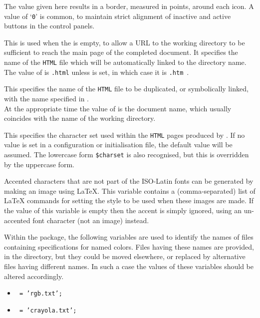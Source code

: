 \begin{htmllist}
\item [\fn{\$NAV\_BORDER}\texttt{ = }\Meta{num}\texttt{;}]
The value given here results in a border, measured in points, around each icon.\html{\\}
A value of `\texttt{0}' is common, to maintain strict
alignment of inactive and active buttons in the control panels.


\item [\fn{\$LINKNAME}\texttt{ = '\char34index.\$EXTN\char34';}]
This is used when the   is empty, 
to allow a URL to the working directory to be sufficient to reach the main page 
of the completed document. 
It specifies the name of the \texttt{HTML} file which will be automatically
linked to the directory name.\html{\\}
The value of  is \texttt{.html} unless  is set, 
in which case it is \texttt{.htm}~. 

\item [\fn{\$LINKPOINT}\texttt{ = '\char34\$FILE\$EXTN\char34';}]
This specifies the name of the \texttt{HTML} file to be duplicated, or symbolically
linked, with the name specified in .\\
At the appropriate time the value of  is the document name, 
which usually coincides with the name of the working directory.

%
%
\item [\fn{\$CHARSET}\texttt{ = 'iso\_8859\_1';}\label{charset}]
This specifies the character set used within the \texttt{HTML} pages
produced by \latextohtml. If no value is set in a configuration
or initialisation file, the default value will be assumed.
The lowercase form \texttt{\$charset} is also recognised, but
this is overridden by the uppercase form.

%
\item [ \fn{\$ACCENT\_IMAGES}\texttt{ = 'large'};]
Accented characters that are not part of the ISO-Latin fonts
can be generated by making an image using \LaTeX.
This variable contains a (comma-separated) list of \LaTeX{} commands
for setting the style to be used when these images are made. 
If the value of this variable is empty then the accent is simply
ignored, using an un-accented font character (not an image) instead.
%
\end{htmllist}

\bigskip\noindent
Within the  package, the following variables are used to
identify the names of files containing specifications for named colors.
Files having these names are provided, in the 
directory, but they could be moved elsewhere, 
or replaced by alternative files having different names.
In such a case the values of these variables should be altered accordingly.
%
\begin{itemize}
\item []\texttt{ = 'rgb.txt';}
\item []\texttt{ = 'crayola.txt';}
\end{itemize}

